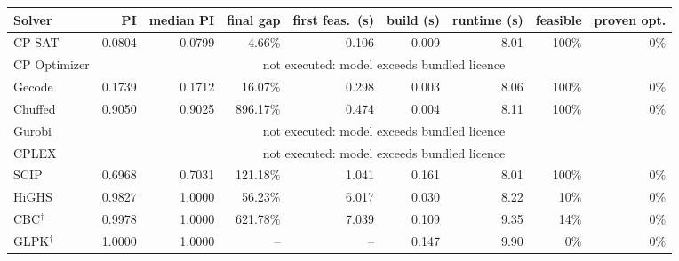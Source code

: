 \begin{tabular}{lrrrrrrrr}
\toprule
Solver & PI & median PI & final gap & first feas.\ (s) & build (s) & runtime (s) & feasible & proven opt. \\
\midrule
CP-SAT & 0.0804 & 0.0799 & 4.66\% & 0.106 & 0.009 & 8.01 & 100\% & 0\% \\
CP Optimizer & \multicolumn{8}{c}{not executed: model exceeds bundled licence} \\
Gecode & 0.1739 & 0.1712 & 16.07\% & 0.298 & 0.003 & 8.06 & 100\% & 0\% \\
Chuffed & 0.9050 & 0.9025 & 896.17\% & 0.474 & 0.004 & 8.11 & 100\% & 0\% \\
Gurobi & \multicolumn{8}{c}{not executed: model exceeds bundled licence} \\
CPLEX & \multicolumn{8}{c}{not executed: model exceeds bundled licence} \\
SCIP & 0.6968 & 0.7031 & 121.18\% & 1.041 & 0.161 & 8.01 & 100\% & 0\% \\
HiGHS & 0.9827 & 1.0000 & 56.23\% & 6.017 & 0.030 & 8.22 & 10\% & 0\% \\
CBC$^\dagger$ & 0.9978 & 1.0000 & 621.78\% & 7.039 & 0.109 & 9.35 & 14\% & 0\% \\
GLPK$^\dagger$ & 1.0000 & 1.0000 & -- & -- & 0.147 & 9.90 & 0\% & 0\% \\
\bottomrule
\end{tabular}
